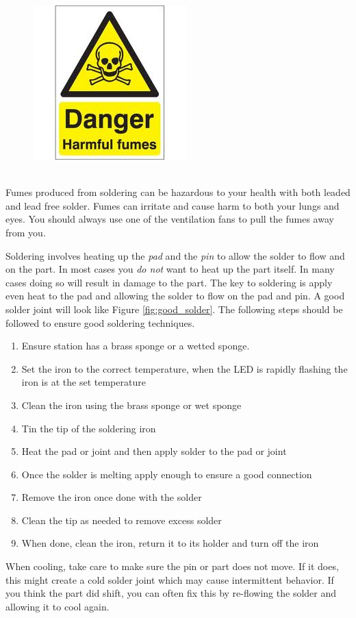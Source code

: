 \begin{framed}
\begin{figure}
\includegraphics[width=.7in]{images/fumes_hazard}
\end{figure}
\ \\
Fumes produced from soldering can be hazardous to your health with both leaded and lead free solder.  Fumes can irritate and cause harm to both your lungs and eyes.  You should always use one of the ventilation fans to pull the fumes away from you.
\end{framed}
Soldering involves heating up the \emph{pad} and the \emph{pin} to allow the solder to flow and on the part.  In most cases you \emph{do not} want to heat up the part itself.  In many cases doing so will result in damage to the part.  The key to soldering is apply even heat to the pad and allowing the solder to flow on the pad and pin.  A good solder joint will look like Figure \ref{fig:good_solder}.  The following steps should be followed to ensure good soldering techniques.

\begin{enumerate}
\item Ensure station has a brass sponge or a wetted sponge.
\item Set the iron to the correct temperature, when the LED is rapidly flashing the iron is at the set temperature
\item Clean the iron using the brass sponge or wet sponge
\item Tin the tip of the soldering iron
\item Heat the pad or joint and then apply solder to the pad or joint
\item Once the solder is melting apply enough to ensure a good connection
\item Remove the iron once done with the solder
\item Clean the tip as needed to remove excess solder
\item When done, clean the iron, return it to its holder and turn off the iron

\end{enumerate}

When cooling, take care to make sure the pin or part does not move.  If it does, this might create a cold solder joint which may cause intermittent behavior.  If you think the part did shift, you can often fix this by re-flowing the solder and allowing it to cool again.

